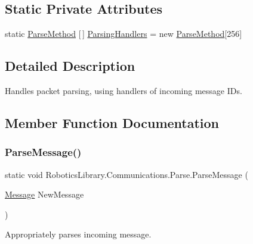 \subsection*{Static Private Attributes}
\begin{DoxyCompactItemize}
\item 
static \hyperlink{class_robotics_library_1_1_communications_1_1_parse_a592095b5638ced6eacabbce7acdb5e75}{Parse\+Method} \mbox{[}$\,$\mbox{]} \hyperlink{class_robotics_library_1_1_communications_1_1_parse_aa2e45508e6d9222047bfbec487628c87}{Parsing\+Handlers} = new \hyperlink{class_robotics_library_1_1_communications_1_1_parse_a592095b5638ced6eacabbce7acdb5e75}{Parse\+Method}\mbox{[}256\mbox{]}
\end{DoxyCompactItemize}


\subsection{Detailed Description}
Handles packet parsing, using handlers of incoming message I\+Ds. 



\subsection{Member Function Documentation}
\mbox{\label{class_robotics_library_1_1_communications_1_1_parse_ad148efeadd6ab19f2fa53d4b90acf890}} 
\subsubsection{\texorpdfstring{Parse\+Message()}{ParseMessage()}}
{\footnotesize\ttfamily static void Robotics\+Library.\+Communications.\+Parse.\+Parse\+Message (\begin{DoxyParamCaption}\item[{\hyperlink{class_robotics_library_1_1_communications_1_1_message}{Message}}]{New\+Message }\end{DoxyParamCaption})\hspace{0.3cm}{\ttfamily [static]}}



Appropriately parses incoming message. 



